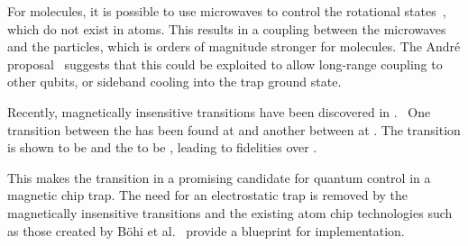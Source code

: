 For molecules, it is possible to use microwaves to control the rotational
states~\cite{Blackmore_2018}, which do not exist in atoms. This results in a
coupling between the microwaves and the particles, which is orders of magnitude
stronger for molecules. The Andr\'e proposal~\cite{Andre2006} suggests that this
could be exploited to allow long-range coupling to other qubits, or sideband
cooling into the trap ground state.

Recently, magnetically insensitive transitions have been discovered in
\CaF{}.~\cite{PhysRevLett.120.163201, Blackmore_2018, }  One transition between the  has been found at  and another between 
at . The  transition is shown to be 
and the  to be , leading to fidelities over
.

This makes the  transition in \CaF{} a promising candidate for
quantum control in a magnetic chip trap. The need for an electrostatic trap is
removed by the magnetically insensitive transitions and the existing atom chip
technologies such as those created by B\"ohi et al.~\cite{Boehi2009} provide a
blueprint for implementation.
